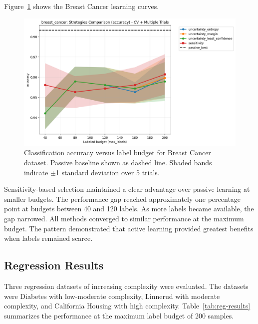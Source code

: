 \documentclass[conference]{IEEEtran}
\begin{document}
Figure~\ref{fig:breast-compare} shows the Breast Cancer learning curves.

\begin{figure}[t]
\centering
\includegraphics[width=0.95\columnwidth]{figures/cls_breast_cancer_comparison_accuracy.png}
\caption{Classification accuracy versus label budget for Breast Cancer dataset. Passive baseline shown as dashed line. Shaded bands indicate $\pm$1 standard deviation over 5 trials.}
\label{fig:breast-compare}
\end{figure}

Sensitivity-based selection maintained a clear advantage over passive learning at smaller budgets. The performance gap reached approximately one percentage point at budgets between 40 and 120 labels. As more labels became available, the gap narrowed. All methods converged to similar performance at the maximum budget. The pattern demonstrated that active learning provided greatest benefits when labels remained scarce.

\subsection{Regression Results}

Three regression datasets of increasing complexity were evaluated. The datasets were Diabetes with low-moderate complexity, Linnerud with moderate complexity, and California Housing with high complexity. Table~\ref{tab:reg-results} summarizes the performance at the maximum label budget of 200 samples.
\end{document}
